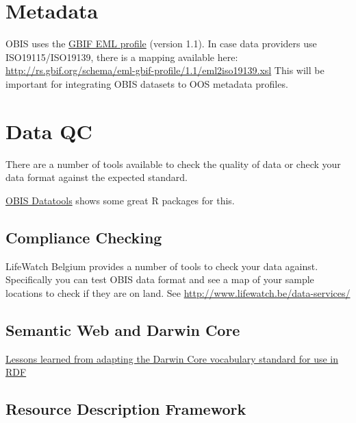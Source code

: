 \documentclass[]{book}
\begin{document}
\hypertarget{metadata}{%
\section{Metadata}\label{metadata}}

OBIS uses the \href{http://rs.gbif.org/schema/eml-gbif-profile/1.1/eml-gbif-profile.xsd}{GBIF EML profile} (version 1.1). In case data providers use ISO19115/ISO19139, there is a mapping available here: \url{http://rs.gbif.org/schema/eml-gbif-profile/1.1/eml2iso19139.xsl} This will be important for integrating OBIS datasets to OOS metadata profiles.

\hypertarget{data-qc}{%
\section{Data QC}\label{data-qc}}

There are a number of tools available to check the quality of data or check your data format against the expected standard.

\href{https://obis.org/manual/processing/}{OBIS Datatools} shows some great R packages for this.

\hypertarget{compliance-checking}{%
\subsection{Compliance Checking}\label{compliance-checking}}

LifeWatch Belgium provides a number of tools to check your data against.
Specifically you can test OBIS data format and see a map of your sample locations to check if they are on land.
See \url{http://www.lifewatch.be/data-services/}

\hypertarget{semantic-web-and-darwin-core}{%
\subsection{Semantic Web and Darwin Core}\label{semantic-web-and-darwin-core}}

\href{\%22http://www.semantic-web-journal.net/system/files/swj1093.pdf\%22}{Lessons learned from adapting the Darwin Core vocabulary standard for use in RDF}

\hypertarget{resource-description-framework}{%
\subsection{Resource Description Framework}\label{resource-description-framework}}
\end{document}
